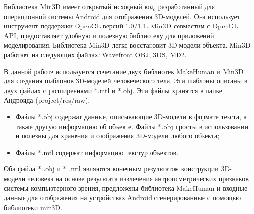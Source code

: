 Библиотека Min3D имеет открытый исходный код, разработанный для операционной системы Android для отображения 3D-моделей. Она использует инструмент поддержки OpenGL версий 1.0/1.1. Min3D совместим с OpenGL API, предоставляет удобную и полезную библиотеку для приложений моделирования. Библиотека Min3D легко восстановит 3D-модели объекта. Min3D работает на следующих файлах: Wavefront OBJ, 3DS, MD2.

В данной работе используется сочетание двух библиотек MakeHuman и Min3D для создания шаблонов 3D-моделей человеческого тела. Эти шаблоны описаны в двух файлах с расширениями *.mtl и *.obj. Эти файлы хранятся в папке Андроида (project/res/raw). 


\begin{itemize}
	\item Файлы *.obj содержат данные, описывающие 3D-модели в формате текста, а также другую информацию об объекте. Файлы *.obj просты в использовании и полезны для хранения и отображения 3D-модели любого объекта;
	\item Файлы *.mtl содержат информацию текстур объектов. 
\end{itemize}
Оба файла * .obj и * .mtl являются конечным результатом конструкции 3D-модели человека на основе результата извлечения антропометрических признаков системы компьютерного зрения, предложены библиотека MakeHuman и входные данные для отображения на устройствах Android сгенерированные с помощью библиотеки min3D.




